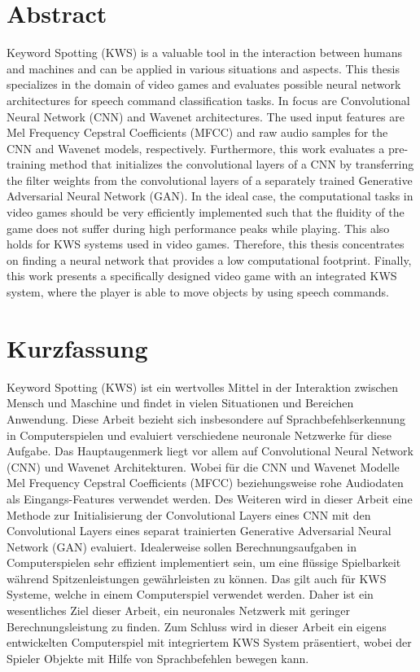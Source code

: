 
\chapter*{Abstract}\label{sec:shards_abstract}
Keyword Spotting (KWS) is a valuable tool in the interaction between humans and machines and can be applied in various situations and aspects.
This thesis specializes in the domain of video games and evaluates possible neural network architectures for speech command classification tasks.
In focus are Convolutional Neural Network (CNN) and Wavenet architectures.
The used input features are Mel Frequency Cepstral Coefficients (MFCC) and raw audio samples for the CNN and Wavenet models, respectively.
Furthermore, this work evaluates a pre-training method that initializes the convolutional layers of a CNN by transferring the filter weights from the convolutional layers of a separately trained Generative Adversarial Neural Network (GAN).
In the ideal case, the computational tasks in video games should be very efficiently implemented such that the fluidity of the game does not suffer during high performance peaks while playing.
This also holds for KWS systems used in video games.
Therefore, this thesis concentrates on finding a neural network that provides a low computational footprint.
Finally, this work presents a specifically designed video game with an integrated KWS system, where the player is able to move objects by using speech commands.



\chapter*{Kurzfassung}
Keyword Spotting (KWS) ist ein wertvolles Mittel in der Interaktion zwischen Mensch und Maschine und findet in vielen Situationen und Bereichen Anwendung.
Diese Arbeit bezieht sich insbesondere auf Sprachbefehlserkennung in Computerspielen und evaluiert verschiedene neuronale Netzwerke für diese Aufgabe.
Das Hauptaugenmerk liegt vor allem auf Convolutional Neural Network (CNN) und Wavenet Architekturen.
Wobei für die CNN und Wavenet Modelle Mel Frequency Cepstral Coefficients (MFCC) beziehungsweise rohe Audiodaten als Eingangs-Features verwendet werden.
Des Weiteren wird in dieser Arbeit eine Methode zur Initialisierung der Convolutional Layers eines CNN mit den Convolutional Layers eines separat trainierten Generative Adversarial Neural Network (GAN) evaluiert.
Idealerweise sollen Berechnungsaufgaben in Computerspielen sehr effizient implementiert sein, um eine flüssige Spielbarkeit während Spitzenleistungen gewährleisten zu können.
Das gilt auch für KWS Systeme, welche in einem Computerspiel verwendet werden.
Daher ist ein wesentliches Ziel dieser Arbeit, ein neuronales Netzwerk mit geringer Berechnungsleistung zu finden.
Zum Schluss wird in dieser Arbeit ein eigens entwickelten Computerspiel mit integriertem KWS System präsentiert, wobei der Spieler Objekte mit Hilfe von Sprachbefehlen bewegen kann.